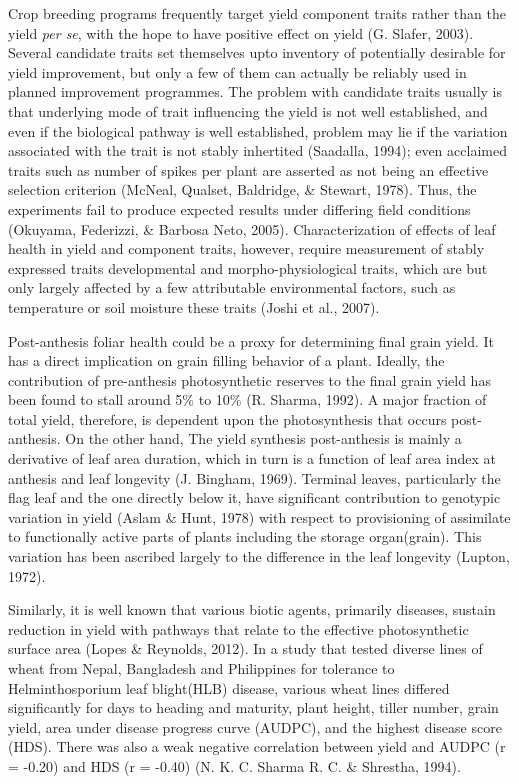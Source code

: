 \documentclass[12pt,oneside]{dukestatscithesis} %
\theoremstyle{definition}
\theoremstyle{definition}
\theoremstyle{definition}
\theoremstyle{remark}
\begin{document}
Crop breeding programs frequently target yield component traits rather
than the yield \emph{per se}, with the hope to have positive effect on
yield (G. Slafer, 2003). Several candidate traits set themselves upto
inventory of potentially desirable for yield improvement, but only a few
of them can actually be reliably used in planned improvement programmes.
The problem with candidate traits usually is that underlying mode of
trait influencing the yield is not well established, and even if the
biological pathway is well established, problem may lie if the variation
associated with the trait is not stably inhertited (Saadalla, 1994);
even acclaimed traits such as number of spikes per plant are asserted as
not being an effective selection criterion (McNeal, Qualset, Baldridge,
\& Stewart, 1978). Thus, the experiments fail to produce expected
results under differing field conditions (Okuyama, Federizzi, \& Barbosa
Neto, 2005). Characterization of effects of leaf health in yield and
component traits, however, require measurement of stably expressed
traits developmental and morpho-physiological traits, which are but only
largely affected by a few attributable environmental factors, such as
temperature or soil moisture these traits (Joshi et al., 2007).

Post-anthesis foliar health could be a proxy for determining final grain
yield. It has a direct implication on grain filling behavior of a plant.
Ideally, the contribution of pre-anthesis photosynthetic reserves to the
final grain yield has been found to stall around 5\% to 10\% (R. Sharma,
1992). A major fraction of total yield, therefore, is dependent upon the
photosynthesis that occurs post-anthesis. On the other hand, The yield
synthesis post-anthesis is mainly a derivative of leaf area duration,
which in turn is a function of leaf area index at anthesis and leaf
longevity (J. Bingham, 1969). Terminal leaves, particularly the flag
leaf and the one directly below it, have significant contribution to
genotypic variation in yield (Aslam \& Hunt, 1978) with respect to
provisioning of assimilate to functionally active parts of plants
including the storage organ(grain). This variation has been ascribed
largely to the difference in the leaf longevity (Lupton, 1972).

Similarly, it is well known that various biotic agents, primarily
diseases, sustain reduction in yield with pathways that relate to the
effective photosynthetic surface area (Lopes \& Reynolds, 2012). In a
study that tested diverse lines of wheat from Nepal, Bangladesh and
Philippines for tolerance to Helminthosporium leaf blight(HLB) disease,
various wheat lines differed significantly for days to heading and
maturity, plant height, tiller number, grain yield, area under disease
progress curve (AUDPC), and the highest disease score (HDS). There was
also a weak negative correlation between yield and AUDPC (r = -0.20) and
HDS (r = -0.40) (N. K. C. Sharma R. C. \& Shrestha, 1994).
\end{document}
